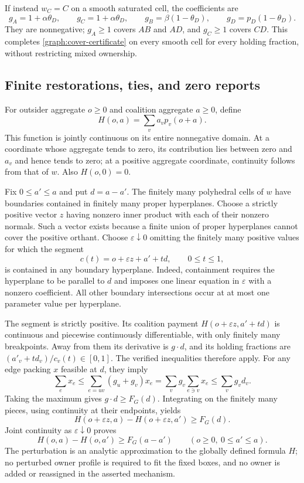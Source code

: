 If instead $w_C=C$ on a smooth saturated cell, the coefficients are
\[
 g_A=1+\alpha\theta_D,\qquad g_C=1+\alpha\theta_D,
 \qquad g_B=\beta(1-\theta_D),\qquad
 g_D=p_D(1-\theta_D).
\]
They are nonnegative; $g_A\ge1$ covers $AB$ and $AD$, and $g_C\ge1$
covers $CD$. This completes \eqref{graph:cover-certificate} on every
smooth cell for every holding fraction, without restricting mixed ownership.

\subsection{Finite restorations, ties, and zero reports}

For outsider aggregate $o\ge0$ and coalition aggregate $a\ge0$, define
\[
 H(o,a)=\sum_v a_v p_v(o+a).
\]
This function is jointly continuous on its entire nonnegative domain.
At a coordinate whose aggregate tends to zero, its contribution lies
between zero and $a_v$ and hence tends to zero; at a positive aggregate
coordinate, continuity follows from that of $w$. Also $H(o,0)=0$.

Fix $0\le a'\le a$ and put $d=a-a'$. The finitely many polyhedral cells
of $w$ have boundaries contained in finitely many proper hyperplanes.
Choose a strictly positive vector $z$ having nonzero inner product with
each of their nonzero normals. Such a vector exists because a finite union
of proper hyperplanes cannot cover the positive orthant. Choose
$\varepsilon\downarrow0$ omitting the finitely many positive values for
which the segment
\[
 c(t)=o+\varepsilon z+a'+td,\qquad 0\le t\le1,
\]
is contained in any boundary hyperplane. Indeed, containment requires the
hyperplane to be parallel to $d$ and imposes one linear equation in
$\varepsilon$ with a nonzero coefficient. All other boundary intersections
occur at at most one parameter value per hyperplane.

The segment is strictly positive. Its coalition payment
$H(o+\varepsilon z,a'+td)$ is continuous and piecewise continuously
differentiable, with only finitely many breakpoints. Away from them its
derivative is $g\cdot d$, and its holding fractions are
$(a'_v+td_v)/c_v(t)\in[0,1]$. The verified inequalities therefore apply.
For any edge packing $x$ feasible at $d$, they imply
\[
 \sum_e x_e\le\sum_{e=uv}(g_u+g_v)x_e
 =\sum_v g_v\sum_{e\ni v}x_e\le\sum_v g_vd_v.
\]
Taking the maximum gives $g\cdot d\ge F_G(d)$. Integrating on the
finitely many pieces, using continuity at their endpoints, yields
\[
 H(o+\varepsilon z,a)-H(o+\varepsilon z,a')\ge F_G(d).
\]
Joint continuity as $\varepsilon\downarrow0$ proves
\begin{equation}\label{graph:finite-out}
 H(o,a)-H(o,a')\ge F_G(a-a')
 \qquad(o\ge0,\ 0\le a'\le a).
\end{equation}
The perturbation is an analytic approximation to the globally defined
formula $H$; no perturbed owner profile is required to fit the fixed boxes,
and no owner is added or reassigned in the asserted mechanism.


